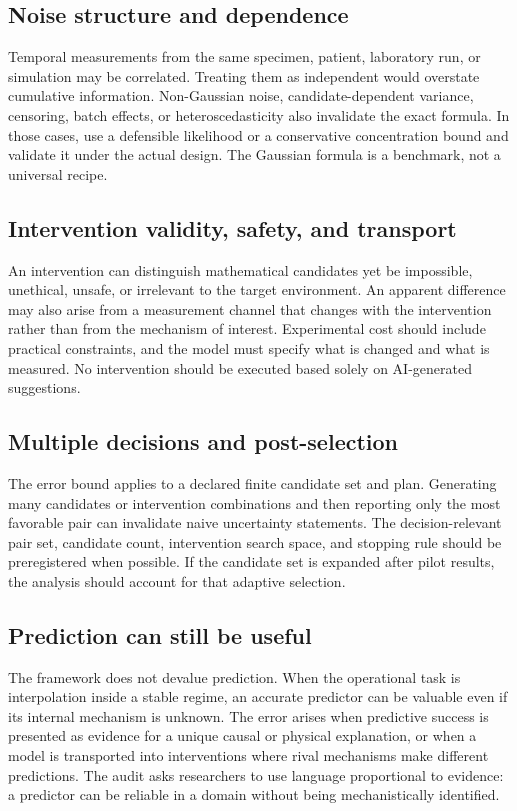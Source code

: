 \documentclass[11pt]{article}
\begin{document}
\subsection{Noise structure and dependence}
Temporal measurements from the same specimen, patient, laboratory run, or simulation may be correlated. Treating them as independent would overstate cumulative information. Non-Gaussian noise, candidate-dependent variance, censoring, batch effects, or heteroscedasticity also invalidate the exact formula. In those cases, use a defensible likelihood or a conservative concentration bound and validate it under the actual design. The Gaussian formula is a benchmark, not a universal recipe.

\subsection{Intervention validity, safety, and transport}
An intervention can distinguish mathematical candidates yet be impossible, unethical, unsafe, or irrelevant to the target environment. An apparent difference may also arise from a measurement channel that changes with the intervention rather than from the mechanism of interest. Experimental cost should include practical constraints, and the model must specify what is changed and what is measured. No intervention should be executed based solely on AI-generated suggestions.

\subsection{Multiple decisions and post-selection}
The error bound applies to a declared finite candidate set and plan. Generating many candidates or intervention combinations and then reporting only the most favorable pair can invalidate naive uncertainty statements. The decision-relevant pair set, candidate count, intervention search space, and stopping rule should be preregistered when possible. If the candidate set is expanded after pilot results, the analysis should account for that adaptive selection.

\subsection{Prediction can still be useful}
The framework does not devalue prediction. When the operational task is interpolation inside a stable regime, an accurate predictor can be valuable even if its internal mechanism is unknown. The error arises when predictive success is presented as evidence for a unique causal or physical explanation, or when a model is transported into interventions where rival mechanisms make different predictions. The audit asks researchers to use language proportional to evidence: a predictor can be reliable in a domain without being mechanistically identified.
\end{document}
